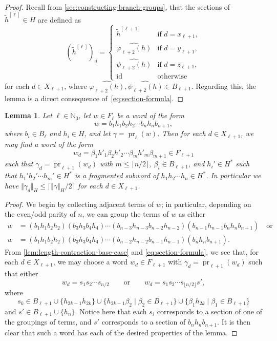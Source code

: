 \documentclass[a4paper]{amsart}
\renewcommand\leq\leqslant
\numberwithin{equation}{section}
\newtheorem{lemma}[theorem]{Lemma}
\theoremstyle{definition}
\theoremstyle{remark}
\newcommand{\N}{\mathbb{N}}
\DeclareMathOperator{\id}{id}
\DeclareMathOperator{\pr}{pr}
\newcommand{\absH}[1]{\Vert #1 \Vert_H}
\newcommand{\bigAbsH}[1]{\bigl\Vert #1 \bigr\Vert_H}
\begin{document}
\begin{proof}
Recall from \cref{sec:constructing-branch-groups}, that the sections of $\widetilde{h}^{[\ell]}\in H$ are defined as
\[
  (\widetilde{h}^{[\ell]})_d = 
  \begin{cases}
    \widetilde{h}^{[\ell+1]} & \text{if } d = x_{\ell+1},\\[3pt]
    \widehat{\varphi_{\ell+2}(h)} & \text{if } d = y_{\ell+1},\\[3pt]
    \widehat{\psi_{\ell+2}(h)} & \text{if } d = z_{\ell+1},\\[3pt]
    \id & \text{otherwise}
  \end{cases}
\]
for each $d \in X_{\ell+1}$, where $\widehat{\varphi_{\ell+2}(h)},\widehat{\psi_{\ell+2}(h)} \in B_{\ell+1}$.
Regarding this, the lemma is a direct consequence of~\eqref{eq:section-formula}.
\end{proof}

\begin{lemma}\label{lem:length-contraction}
Let $\ell \in \N_0$, let $w \in F_{\ell}$ be a word of the form
\[
w = b_1 h_1 b_2 h_2 \cdots b_n h_n b_{n+1},
\]
where $b_i \in B_\ell$ and $h_i\in H$, and let $\gamma = \pr_\ell(w)$.
Then for each $d \in X_{\ell+1}$, we may find a word of the form
\[
w_d = \beta_1 h'_1 \beta_2 h'_2 \cdots \beta_m h'_m \beta_{m+1} \in F_{\ell+1}
\]
such that $\gamma_d = \pr_{\ell+1}(w_d)$ with $m \leq \lceil n/2 \rceil$, $\beta_i \in B_{\ell+1}$, and $h_i'\in H^*$ such that $h_1' h_2' \cdots h_m'\in H^*$ is a fragmented subword of $h_1 h_2 \cdots h_n \in H^*$.
In particular we have $\bigAbsH{\gamma_d} \leq \lceil \absH{\gamma}/2 \rceil$  for each $d\in X_{\ell+1}$.
\end{lemma}

\begin{proof}
We begin by collecting adjacent terms of $w$; in particular, depending on the even/odd parity of $n$, we can group the terms of $w$ as either
\begin{align*}
  w &= (b_1 h_1 b_2 h_2) (b_3 h_3 b_4 h_4)\cdots (b_{n-3} h_{n-3} b_{n-2} h_{n-2}) (b_{n-1} h_{n-1} b_n h_n b_{n+1})\quad\text{or}\\
  w &= (b_1 h_1 b_2 h_2) (b_3 h_3 b_4 h_4)\cdots (b_{n-2} h_{n-2} b_{n-1} h_{n-1}) (b_n h_n b_{n+1}).
\end{align*}
From \cref{lem:length-contraction-base-case} and \eqref{eq:section-formula}, we see that, for each $d\in X_{\ell+1}$, we may choose a word $w_d \in F_{\ell+1}$ with $\gamma_d = \pr_{\ell+1}(w_d)$ such that either
\[
  w_d = s_1 s_2\cdots s_{n/2}
  \qquad
  \text{or}
  \qquad
  w_d = s_1 s_2\cdots s_{\lfloor n/2\rfloor} s',
\]
where
\[
  s_k
  \in
  B_{\ell+1}
  \cup \{ h_{2k-1} h_{2k} \}
  \cup \{ h_{2k-1} \beta_2 \mid \beta_2 \in B_{\ell+1} \}
  \cup \{ \beta_1 h_{2k} \mid \beta_1 \in B_{\ell+1} \}
\]
and
$
  s'
  \in
  B_{\ell+1}
  \cup \{ h_{n} \}
$.
Notice here that each $s_i$ corresponds to a section of one of the groupings of terms, and $s'$ corresponds to a section of $b_n h_n b_{n+1}$.
It is then clear that such a word has each of the desired properties of the lemma.
\end{proof}
\end{document}
